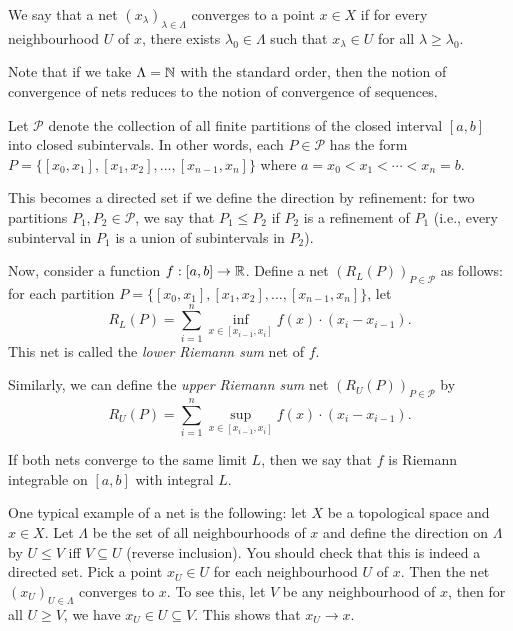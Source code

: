 \begin{definition}
    We say that a net $(x_\lambda)_{\lambda\in\Lambda}$ converges to a point $x\in X$ if for every neighbourhood $U$ of $x$, there exists $\lambda_0\in\Lambda$ such that $x_\lambda\in U$ for all $\lambda\ge \lambda_0$.
\end{definition}

\begin{remark}
    Note that if we take $\Lambda=\mathbb{N}$ with the standard order, then the notion of convergence of nets reduces to the notion of convergence of sequences.
\end{remark}

\begin{example}
    Let $\mathcal{P}$ denote the collection of all finite partitions of the closed interval $[a,b]$ into closed subintervals. In other words, each $P\in \mathcal{P}$ has the form $P=\{[x_0,x_1],[x_1,x_2],\ldots,[x_{n-1},x_n]\}$ where $a=x_0<x_1<\cdots<x_n=b$.
    
    This becomes a directed set if we define the direction by refinement: for two partitions $P_1,P_2\in\mathcal{P}$, we say that $P_1\le P_2$ if $P_2$ is a refinement of $P_1$ (i.e., every subinterval in $P_1$ is a union of subintervals in $P_2$).

    Now, consider a function $f:[a,b]\to \mathbb{R}$. Define a net $(R_L(P))_{P\in \mathcal{P}}$ as follows: for each partition $P=\{[x_0,x_1],[x_1,x_2],\ldots,[x_{n-1},x_n]\}$, let
    $$R_L(P)=\sum_{i=1}^n \inf_{x\in [x_{i-1},x_i]} f(x) \cdot (x_i - x_{i-1}).$$
    This net is called the \emph{lower Riemann sum} net of $f$.

    Similarly, we can define the \emph{upper Riemann sum} net $(R_U(P))_{P\in \mathcal{P}}$ by
    $$R_U(P)=\sum_{i=1}^n \sup_{x\in [x_{i-1},x_i]} f(x) \cdot (x_i - x_{i-1}).$$

    If both nets converge to the same limit $L$, then we say that $f$ is Riemann integrable on $[a,b]$ with integral $L$.
\end{example}


\begin{example}
    One typical example of a net is the following: let $X$ be a topological space and $x\in X$. Let $\Lambda$ be the set of all neighbourhoods of $x$ and define the direction on $\Lambda$ by $U\le V$ iff $V\subseteq U$ (reverse inclusion). You should check that this is indeed a directed set.  Pick a point $x_U\in U$ for each neighbourhood $U$ of $x$. Then the net $(x_U)_{U\in\Lambda}$ converges to $x$. To see this, let $V$ be any neighbourhood of $x$, then for all $U\geq V$, we have $x_U\in U\subseteq V$. This shows that $x_U\to x$.
\end{example}

